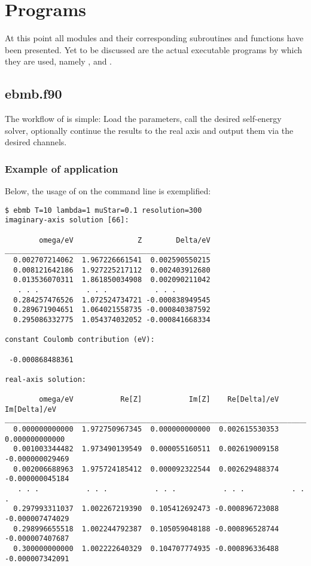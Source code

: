 

\section{Programs}

At this point all modules and their corresponding subroutines and functions have
been presented. Yet to be discussed are the actual executable programs by which
they are used, namely ,  and .

\subsection{ebmb.f90}

The workflow of  is simple: Load the parameters, call the desired
self-energy solver, optionally continue the results to the real axis and output
them via the desired channels.



\subsubsection{Example of application}

Below, the usage of  on the command line is exemplified:
%
\begin{verbatim}
$ ebmb T=10 lambda=1 muStar=0.1 resolution=300
imaginary-axis solution [66]:

        omega/eV               Z        Delta/eV
________________________________________________
  0.002707214062  1.967226661541  0.002590550215
  0.008121642186  1.927225217112  0.002403912680
  0.013536070311  1.861850034908  0.002090211042
   . . .           . . .           . . .
  0.284257476526  1.072524734721 -0.000838949545
  0.289671904651  1.064021558735 -0.000840387592
  0.295086332775  1.054374032052 -0.000841668334

constant Coulomb contribution (eV):

 -0.000868488361

real-axis solution:

        omega/eV           Re[Z]           Im[Z]    Re[Delta]/eV    Im[Delta]/eV
________________________________________________________________________________
  0.000000000000  1.972750967345  0.000000000000  0.002615530353  0.000000000000
  0.001003344482  1.973490139549  0.000055160511  0.002619009158 -0.000000029469
  0.002006688963  1.975724185412  0.000092322544  0.002629488374 -0.000000045184
   . . .           . . .           . . .           . . .           . . .
  0.297993311037  1.002267219390  0.105412692473 -0.000896723088 -0.000007474029
  0.298996655518  1.002244792387  0.105059048188 -0.000896528744 -0.000007407687
  0.300000000000  1.002222640329  0.104707774935 -0.000896336488 -0.000007342091
\end{verbatim}

